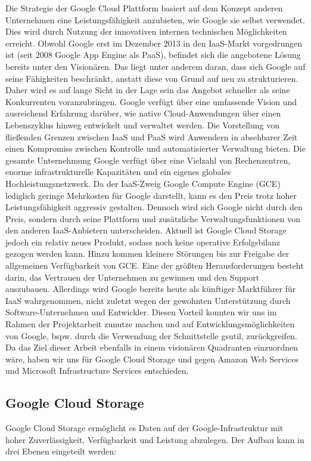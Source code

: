 \documentclass[13pt,a4paper,bibliography=totocnumbered,listof=totocnumbered]{scrartcl}
\begin{document}
Die Strategie der Google Cloud Plattform basiert auf dem Konzept anderen Unternehmen eine Leistungsfähigkeit anzubieten, wie Google sie selbst verwendet. Dies wird durch Nutzung der innovativen internen technischen Möglichkeiten erreicht. Obwohl Google erst im Dezember 2013 in den IaaS-Markt vorgedrungen ist (seit 2008 Google App Engine als PaaS), befindet sich die angebotene Lösung bereits unter den Visionären. Das liegt unter anderem daran, dass sich Google auf seine Fähigkeiten beschränkt, anstatt diese von Grund auf neu zu strukturieren. Daher wird es auf lange Sicht in der Lage sein das Angebot schneller als seine Konkurrenten voranzubringen. Google verfügt über eine umfassende Vision und ausreichend Erfahrung darüber, wie native Cloud-Anwendungen über einen Lebenszyklus hinweg entwickelt und verwaltet werden. Die Vorstellung von fließenden Grenzen zwischen IaaS und PaaS wird Anwendern in absehbarer Zeit einen Kompromiss zwischen Kontrolle und automatisierter Verwaltung bieten. Die gesamte Unternehmung Google verfügt über eine Vielzahl von Rechenzentren, enorme infrastrukturelle Kapazitäten und ein eigenes globales Hochleistungsnetzwerk. Da der IaaS-Zweig Google Compute Engine (GCE) lediglich geringe Mehrkosten für Google darstellt, kann es den Preis trotz hoher Leistungsfähigkeit aggressiv gestalten. Dennoch wird sich Google nicht durch den Preis, sondern durch seine Plattform und zusätzliche Verwaltungsfunktionen von den anderen IaaS-Anbietern unterscheiden. Aktuell ist Google Cloud Storage jedoch ein relativ neues Produkt, sodass noch keine operative Erfolgsbilanz gezogen werden kann. Hinzu kommen kleinere Störungen bis zur Freigabe der allgemeinen Verfügbarkeit von GCE. Eine der größten Herausforderungen besteht darin, das Vertrauen der Unternehmen zu gewinnen und den Support auszubauen. Allerdings wird Google bereits heute als künftiger Marktführer für IaaS wahrgenommen, nicht zuletzt wegen der gewohnten Unterstützung durch Software-Unternehmen und Entwickler. Diesen Vorteil konnten wir uns im Rahmen der Projektarbeit zunutze machen und auf Entwicklungsmöglichkeiten von Google, bspw. durch die Verwendung der Schnittstelle gsutil, zurückgreifen. Da das Ziel dieser Arbeit ebenfalls in einem visionären Quadranten einzuordnen wäre, haben wir uns für Google Cloud Storage und gegen Amazon Web Services und Microsoft Infrastructure Services entschieden.

\subsection{Google Cloud Storage}
Google Cloud Storage ermöglicht es Daten auf der Google-Infrastruktur mit hoher Zuverlässigkeit, Verfügbarkeit und Leistung abzulegen. Der Aufbau kann in drei Ebenen \cite{40} eingeteilt werden:
\end{document}
